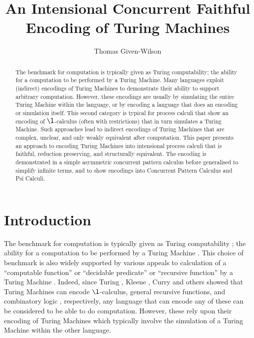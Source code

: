 \documentclass[submission,copyright,creativecommons]{eptcs}
\title{An Intensional Concurrent Faithful Encoding of Turing Machines}
\author{Thomas Given-Wilson
\institute{INRIA, Paris, France
\footnote{This work has been supported by the project ANR-12-IS02-001 PACE.}
}
\email{thomas.given-wilson@inria.fr}
}
\begin{document}
\makeatactive

\maketitle  

\begin{abstract}
The benchmark for computation is typically given as Turing computability;
the ability for a computation to be performed by a Turing Machine.
Many languages exploit (indirect) encodings of Turing Machines to demonstrate
their ability to support arbitrary computation.
However, these encodings are usually by simulating the entire Turing Machine
within the language, or by encoding a language that does an encoding or
simulation itself.
This second category is typical for process calculi that show an encoding of
$\l$-calculus (often with restrictions) that in turn simulates a Turing Machine.
Such approaches lead to indirect encodings of Turing Machines that are complex,
unclear, and only weakly equivalent after computation.
This paper presents an approach to encoding Turing Machines into intensional
process calculi that is faithful, reduction preserving, and structurally
equivalent.
The encoding is demonstrated in a simple asymmetric concurrent pattern calculus
before generalised to simplify infinite terms, and to show encodings into
Concurrent Pattern Calculus and Psi Calculi.
\end{abstract}

\section{Introduction}
\label{sec:intro}

The benchmark for computation is typically given as Turing computability
\cite{zbMATH02522537,Kleene52,McCarthy:1960:RFS:367177.367199,boolos2007computability};
the ability for a computation to be performed by a Turing Machine
\cite{turing36}.
This choice of benchmark is also widely supported by various appeals to
calculation of a ``computable function'' or ``decidable predicate'' or
``recursive function'' by a Turing Machine
\cite{zbMATH02522537,Kleene52,Curry58combinatorylogic,Curry72combinatorylogic,jay2011}.
Indeed, since Turing \cite{zbMATH02522537}, Kleene \cite{Kleene52}, Curry
\cite{Curry58combinatorylogic,Curry72combinatorylogic}
and others showed that Turing Machines can encode $\l$-calculus, general recursive functions, 
and combinatory logic \cite{685558}, respectively,
any language that can encode any of these can be considered to be able to
do computation.
However, these rely upon their encoding of Turing Machines which typically
involve the simulation of a Turing Machine within the other language.
\end{document}
